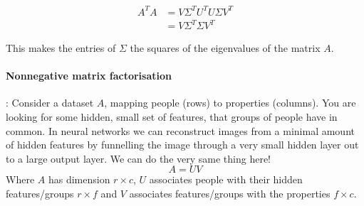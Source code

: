 \begin{equation}
    \begin{aligned} 
        A^T A &= V \Sigma^T U^T U \Sigma V^T \\
              &= V \Sigma^T \Sigma V^T
    \end{aligned}
\end{equation}

This makes the entries of $\Sigma$ the squares of the eigenvalues of the matrix $A$.

\paragraph{Nonnegative matrix factorisation}: Consider a dataset $A$, mapping people (rows) to properties (columns). You are looking for some hidden, small set of features, that groups of people have in common. 
In neural networks we can reconstruct images from a minimal amount of hidden features by funnelling the image through a very small hidden layer out to a large output layer. We can do the very same thing here!
$$ A = U V $$
Where $A$ has dimension $r \times c$, $U$ associates people with their hidden features/groups $r \times f$ and $V$ associates features/groups with the properties $f \times c$.
